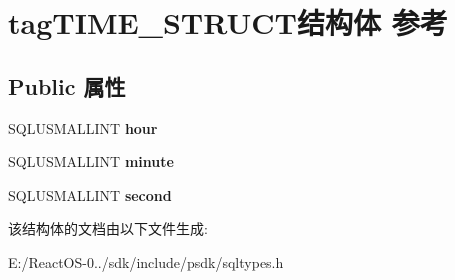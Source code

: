 \hypertarget{structtag_t_i_m_e___s_t_r_u_c_t}{}\section{tag\+T\+I\+M\+E\+\_\+\+S\+T\+R\+U\+C\+T结构体 参考}
\label{structtag_t_i_m_e___s_t_r_u_c_t}
\subsection*{Public 属性}
\begin{DoxyCompactItemize}
\item 
\mbox{\label{structtag_t_i_m_e___s_t_r_u_c_t_a2b70155a1d218b2dec5302842e4ffcf9}} 
S\+Q\+L\+U\+S\+M\+A\+L\+L\+I\+NT {\bfseries hour}
\item 
\mbox{\label{structtag_t_i_m_e___s_t_r_u_c_t_a55c7d1f4300adb1b8142502b890ce42e}} 
S\+Q\+L\+U\+S\+M\+A\+L\+L\+I\+NT {\bfseries minute}
\item 
\mbox{\label{structtag_t_i_m_e___s_t_r_u_c_t_a6f3b3a2483b589d04f5d9975c8490c65}} 
S\+Q\+L\+U\+S\+M\+A\+L\+L\+I\+NT {\bfseries second}
\end{DoxyCompactItemize}


该结构体的文档由以下文件生成\+:\begin{DoxyCompactItemize}
\item 
E\+:/\+React\+O\+S-\/0../sdk/include/psdk/sqltypes.\+h\end{DoxyCompactItemize}
